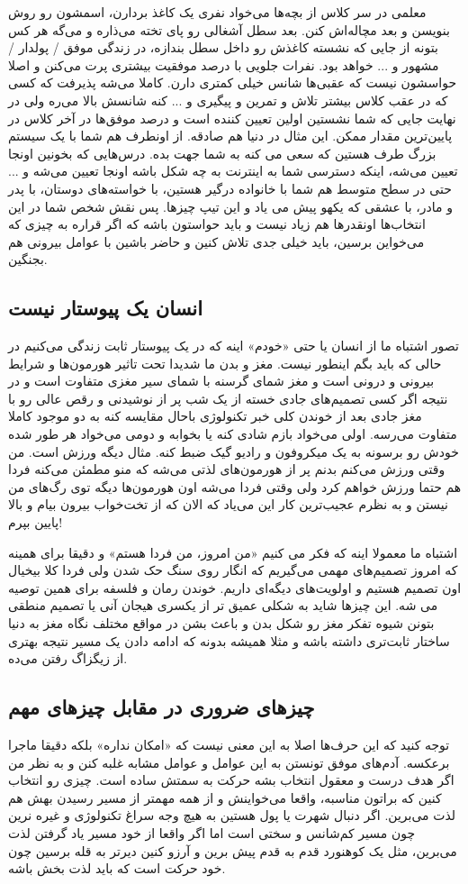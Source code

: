 معلمی در سر کلاس از بچه‌ها می‌خواد نفری یک کاغذ بردارن، اسمشون رو روش بنویسن و بعد مچاله‌اش کنن. بعد سطل آشغالی رو پای تخته می‌ذاره و می‌گه هر کس بتونه از جایی که نشسته کاغذش رو داخل سطل بندازه، در زندگی موفق / پولدار / مشهور و ... خواهد بود. نفرات جلویی با درصد موفقیت بیشتری پرت می‌کنن و اصلا حواسشون نیست که عقبی‌ها شانس خیلی کمتری دارن. کاملا می‌شه پذیرفت که کسی که در عقب کلاس بیشتر تلاش و تمرین و پیگیری و ... کنه شانسش بالا می‌ره ولی در نهایت جایی که شما نشستین اولین تعیین کننده است و درصد موفق‌ها در آخر کلاس در پایین‌ترین مقدار ممکن.
این مثال در دنیا هم صادقه. از اونطرف هم شما با یک سیستم بزرگ طرف هستین که سعی می کنه به شما جهت بده. درس‌هایی که بخونین اونجا تعیین می‌شه، اینکه دسترسی شما به اینترنت به چه شکل باشه اونجا تعیین می‌شه و ... حتی در سطح متوسط هم شما با خانواده درگیر هستین، با خواسته‌های دوستان، با پدر و مادر، با عشقی که یکهو پیش می یاد و این تیپ چیزها. پس نقش شخص شما در این انتخاب‌ها اونقدرها هم زیاد نیست و باید حواستون باشه که اگر قراره به چیزی که می‌خواین برسین، باید خیلی جدی تلاش کنین و حاضر باشین با عوامل بیرونی هم بجنگین.
\subsection*{انسان یک پیوستار نیست}
تصور اشتباه ما از انسان یا حتی «خودم» اینه که در یک پیوستار ثابت زندگی می‌کنیم در حالی که باید بگم اینطور نیست. مغز و بدن ما شدیدا تحت تاثیر هورمون‌ها و شرایط بیرونی و درونی است و مغز شمای گرسنه با شمای سیر مغزی متفاوت است و در نتیجه اگر کسی تصمیم‌های جادی خسته از یک شب پر از نوشیدنی و رقص عالی رو با مغز جادی بعد از خوندن کلی خبر تکنولوژی باحال مقایسه کنه به دو موجود کاملا متفاوت می‌رسه. اولی می‌خواد بازم شادی کنه یا بخوابه و دومی می‌خواد هر طور شده خودش رو برسونه به یک میکروفون و رادیو گیک
ضبط کنه. مثال دیگه ورزش است. من وقتی ورزش می‌کنم بدنم پر از هورمون‌های لذتی می‌شه که منو مطمئن می‌کنه فردا هم حتما ورزش خواهم کرد ولی وقتی فردا می‌شه اون هورمون‌ها دیگه توی رگ‌های من نیستن و به نظرم عجیب‌ترین کار این می‌یاد که الان که از تخت‌خواب بیرون بیام و بالا پایین بپرم!

اشتباه ما معمولا اینه که فکر می کنیم «من امروز، من فردا هستم» و دقیقا برای همینه که امروز تصمیم‌های مهمی می‌گیریم که انگار روی سنگ حک شدن ولی فردا کلا بیخیال اون تصمیم هستیم و اولویت‌های دیگه‌ای داریم. خوندن رمان و فلسفه برای همین توصیه می شه. این چیزها شاید به شکلی عمیق تر از یکسری هیجان آنی یا تصمیم منطقی بتونن شیوه تفکر مغز رو شکل بدن و باعث بشن در مواقع مختلف نگاه مغز به دنیا ساختار ثابت‌تری داشته باشه و مثلا همیشه بدونه که ادامه دادن یک مسیر نتیجه بهتری از زیگزاگ رفتن می‌ده.
\subsection*{چیزهای ضروری در مقابل چیزهای مهم}
توجه کنید که این حرف‌ها اصلا به این معنی نیست که «امکان نداره» بلکه دقیقا ماجرا برعکسه. آدم‌های موفق تونستن به این عوامل و عوامل مشابه غلبه کنن و به نظر من اگر هدف درست و معقول انتخاب بشه حرکت به سمتش ساده است. چیزی رو انتخاب کنین که براتون مناسبه، واقعا می‌خواینش و از همه مهمتر از مسیر رسیدن بهش هم لذت می‌برین. اگر دنبال شهرت یا پول هستین به هیچ وجه سراغ تکنولوژی و غیره نرین چون مسیر کم‌شانس و سختی است اما اگر واقعا از خود مسیر یاد گرفتن لذت می‌برین، مثل یک کوهنورد قدم به قدم پیش برین و آرزو کنین دیرتر به قله برسین چون خود حرکت است که باید لذت بخش باشه.
